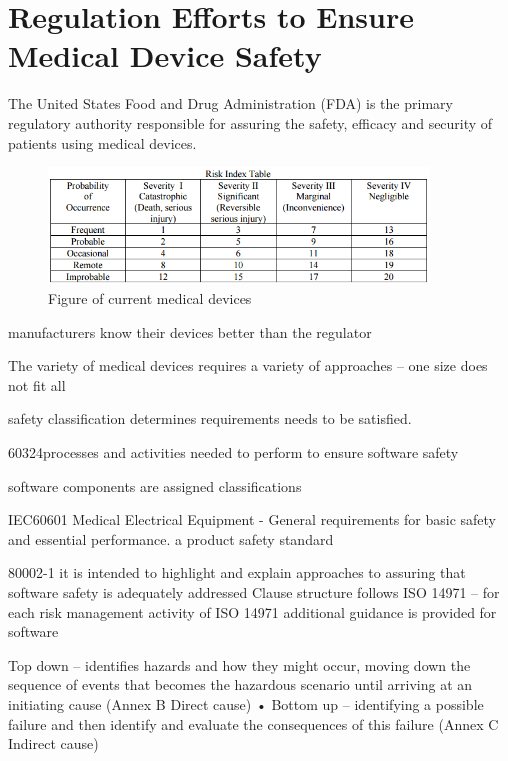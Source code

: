 \section{Regulation Efforts to Ensure Medical Device Safety}
The United States Food and Drug Administration (FDA) is the primary regulatory authority responsible for assuring the safety, efficacy and security of patients using medical devices. 
\begin{figure}[t]
		\centering
		\includegraphics[width=0.9\textwidth]{figs/risk.jpg}
		\caption{\small Figure of current medical devices}
		\label{fig:Cur}
\end{figure}

manufacturers know their devices better than the regulator

The variety of medical devices requires a variety of
approaches – one size does not fit all

safety classification determines requirements needs to be satisfied.

60324processes and activities needed to perform to ensure software safety

software components are assigned classifications

IEC60601 Medical Electrical Equipment - General requirements for basic safety and essential performance. a product safety standard

80002-1  it is intended to highlight and explain approaches to assuring that software safety is adequately addressed
Clause structure follows ISO 14971 – for each risk management activity of ISO 14971 additional guidance is provided for software

Top down
– identifies hazards and how they might occur, moving
down the sequence of events that becomes the
hazardous scenario until arriving at an initiating cause
(Annex B Direct cause)
• Bottom up
– identifying a possible failure and then identify and
evaluate the consequences of this failure (Annex C
Indirect cause)

